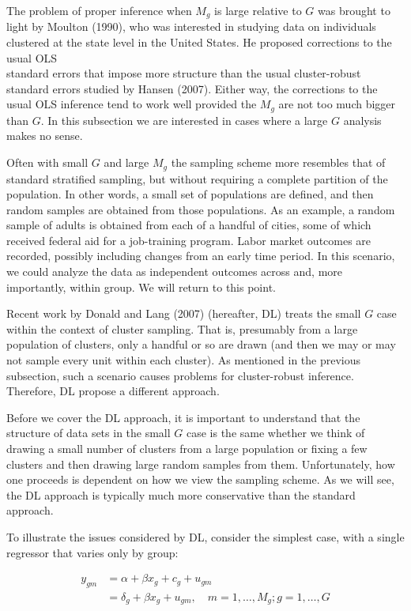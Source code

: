 \documentclass[10pt]{article}
\begin{document}
The problem of proper inference when $M_{g}$ is large relative to $G$ was brought to light by Moulton (1990), who was interested in studying data on individuals clustered at the state level in the United States. He proposed corrections to the usual OLS\\
standard errors that impose more structure than the usual cluster-robust standard errors studied by Hansen (2007). Either way, the corrections to the usual OLS inference tend to work well provided the $M_{g}$ are not too much bigger than $G$. In this subsection we are interested in cases where a large $G$ analysis makes no sense.

Often with small $G$ and large $M_{g}$ the sampling scheme more resembles that of standard stratified sampling, but without requiring a complete partition of the population. In other words, a small set of populations are defined, and then random samples are obtained from those populations. As an example, a random sample of adults is obtained from each of a handful of cities, some of which received federal aid for a job-training program. Labor market outcomes are recorded, possibly including changes from an early time period. In this scenario, we could analyze the data as independent outcomes across and, more importantly, within group. We will return to this point.

Recent work by Donald and Lang (2007) (hereafter, DL) treats the small $G$ case within the context of cluster sampling. That is, presumably from a large population of clusters, only a handful or so are drawn (and then we may or may not sample every unit within each cluster). As mentioned in the previous subsection, such a scenario causes problems for cluster-robust inference. Therefore, DL propose a different approach.

Before we cover the DL approach, it is important to understand that the structure of data sets in the small $G$ case is the same whether we think of drawing a small number of clusters from a large population or fixing a few clusters and then drawing large random samples from them. Unfortunately, how one proceeds is dependent on how we view the sampling scheme. As we will see, the DL approach is typically much more conservative than the standard approach.

To illustrate the issues considered by DL, consider the simplest case, with a single regressor that varies only by group:


\begin{align*}
y_{g m} & =\alpha+\beta x_{g}+c_{g}+u_{g m}  \tag{20.64}\\
& =\delta_{g}+\beta x_{g}+u_{g m}, \quad m=1, \ldots, M_{g} ; g=1, \ldots, G \tag{20.65}
\end{align*}
\end{document}

